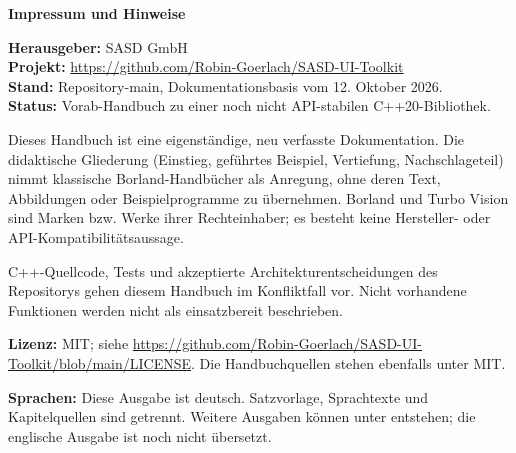 \ifdefined\SASDPrintEdition\ifdefined\SASDPrintEdition\cleardoublepage\else\clearpage\fi\else\clearpage\fi
\thispagestyle{plain}
{\Large\bfseries Impressum und Hinweise\par}
\vspace{.6cm}
\noindent\textbf{Herausgeber:} SASD GmbH\\
\textbf{Projekt:} \url{https://github.com/Robin-Goerlach/SASD-UI-Toolkit}\\
\textbf{Stand:} Repository-main, Dokumentationsbasis vom 12. Oktober 2026.\\
\textbf{Status:} Vorab-Handbuch zu einer noch nicht API-stabilen C++20-Bibliothek.
\par\medskip
Dieses Handbuch ist eine eigenständige, neu verfasste Dokumentation. Die
didaktische Gliederung (Einstieg, geführtes Beispiel, Vertiefung,
Nachschlageteil) nimmt klassische Borland-Handbücher als Anregung,
ohne deren Text, Abbildungen oder Beispielprogramme zu übernehmen.
Borland und Turbo Vision sind Marken bzw. Werke ihrer Rechteinhaber;
es besteht keine Hersteller- oder API-Kompatibilitätsaussage.
\par\medskip
C++-Quellcode, Tests und akzeptierte Architekturentscheidungen des Repositorys
gehen diesem Handbuch im Konfliktfall vor. Nicht vorhandene Funktionen
werden nicht als einsatzbereit beschrieben.
\par\medskip
\textbf{Lizenz:} MIT; siehe \url{https://github.com/Robin-Goerlach/SASD-UI-Toolkit/blob/main/LICENSE}.
Die Handbuchquellen stehen ebenfalls unter MIT.
\par\medskip
\textbf{Sprachen:} Diese Ausgabe ist deutsch. Satzvorlage, Sprachtexte und
Kapitelquellen sind getrennt. Weitere Ausgaben können unter
 entstehen; die englische Ausgabe ist
noch nicht übersetzt.
\cleardoublepage
